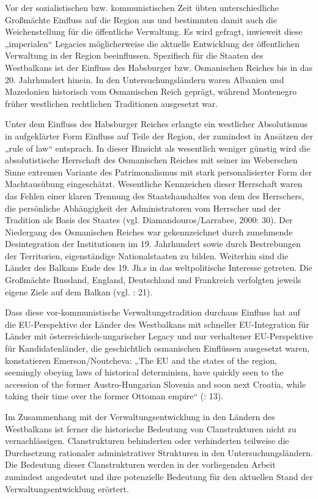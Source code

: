 Vor der sozialistischen bzw. kommunistischen Zeit übten unterschiedliche Großmächte Einfluss auf die Region aus und bestimmten damit auch die Weichenstellung für die öffentliche Verwaltung. Es wird gefragt, inwieweit diese „imperialen“ Legacies möglicherweise die aktuelle Entwicklung der öffentlichen Verwaltung in der Region beeinflussen. Spezifisch für die Staaten des Westbalkans ist der Einfluss des Habsburger bzw. Osmanischen Reiches bis in das 20. Jahrhundert hinein. In den Untersuchungsländern waren Albanien und Mazedonien historisch vom Osmanischen Reich geprägt, während Montenegro früher westlichen rechtlichen Traditionen ausgesetzt war.\par
Unter dem Einfluss des Habsburger Reiches erlangte ein westlicher Absolutismus in aufgeklärter Form Einfluss auf Teile der Region, der zumindest in Ansätzen der „rule of law“ entsprach. In dieser Hinsicht als wesentlich weniger günstig wird die absolutistische Herrschaft des Osmanischen Reiches mit seiner im Weberschen Sinne extremen Variante des Patrimonalismus mit stark personalisierter Form der Machtausübung eingeschätzt. Wesentliche Kennzeichen dieser Herrschaft waren das Fehlen einer klaren Trennung des Staatshaushaltes von dem des Herrschers, die persönliche Abhängigkeit der Administratoren vom Herrscher und der Tradition als Basis des Staates (vgl. Diamandouros/Larrabee, 2000: 30). Der Niedergang des Osmanischen Reiches war gekennzeichnet durch zunehmende Desintegration der Institutionen im 19. Jahrhundert sowie durch Bestrebungen der Territorien, eigenständige Nationalstaaten zu bilden. Weiterhin sind die Länder des Balkans Ende des 19. Jh.s in das weltpolitische Interesse getreten. Die Großmächte Russland, England, Deutschland und Frankreich verfolgten jeweils eigene Ziele auf dem Balkan (vgl. \cite{farada02}: 21).\par
Dass diese vor-kommunistische Verwaltungstradition durchaus Einfluss hat auf die EU-Perspektive der Länder des Westbalkans mit schneller EU-Integration für Länder mit österreichisch-ungarischer Legacy und nur verhaltener EU-Perspektive für Kandidatenländer, die geschichtlich osmanischen Einflüssen ausgesetzt waren, konstatieren Emerson/Noutcheva: „The EU and the states of the region, seemingly obeying laws of historical determinism, have quickly seen to the accession of the former Austro-Hungarian Slovenia and soon next Croatia, while taking their time over the former Ottoman empire“ (\cite{emenou}: 13). \par
Im Zusammenhang mit der Verwaltungsentwicklung in den Ländern des Westbalkans ist ferner die historische Bedeutung von Clanstrukturen nicht zu vernachlässigen. Clanstrukturen behinderten oder verhinderten teilweise die Durchsetzung rationaler administrativer Strukturen in den Untersuchungsländern. Die Bedeutung dieser Clanstrukturen werden in der vorliegenden Arbeit zumindest angedeutet und ihre potenzielle Bedeutung für den aktuellen Stand der Verwaltungsentwicklung erörtert.\par
